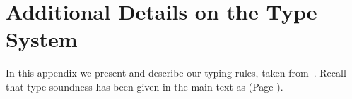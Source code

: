 
\section{Additional Details on the Type System}
\label{app:types}

In this appendix we  
present and describe our typing rules, taken from~\cite{KouzapasPY17}. %
Recall that type soundness has been given in the main text as  (Page \pageref{t:sr}).

%
%
%
%	
